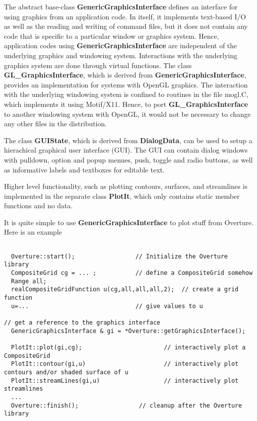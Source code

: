 \documentclass{article}
\newcommand{\Index}[1]{#1\index{#1}}
\begin{document}
The abstract base-class {\bf GenericGraphicsInterface} defines an
interface for using graphics from an application code. In itself, it
implements text-based I/O as well as the reading and writing of
command files, but it does not contain any code that is specific to a
particular window or graphics system. Hence, application codes using
{\bf GenericGraphicsInterface} are independent of the underlying
graphics and windowing system. Interactions with the underlying
graphics system are done through virtual functions. The class {\bf
GL\_GraphicsInterface}, which is derived from {\bf
GenericGraphicsInterface}, provides an implementation for systems with
OpenGL graphics. The interaction with the underlying windowing system
is confined to routines in the file mogl.C, which implements it using
\Index{Motif}/X11. Hence, to port {\bf GL\_GraphicsInterface} to
another windowing system with OpenGL, it would not be necessary to
change any other files in the distribution.

The class {\bf GUIState}, which is derived from {\bf DialogData}, can
be used to setup a hierachical graphical user interface (GUI). The GUI
can contain dialog windows with pulldown, option and popup menues,
push, toggle and radio buttons, as well as informative labels and
textboxes for editable text.

Higher level functionality, such as plotting contours, surfaces, and
streamlines is implemented in the separate class {\bf PlotIt}, which
only contains static member functions and no data.

\vspace{0.1\baselineskip}
It is quite simple to use {\bf GenericGraphicsInterface} to plot stuff from
Overture. Here is an example 
{\footnotesize
\begin{verbatim}

  Overture::start();                 // Initialize the Overture library
  CompositeGrid cg = ... ;           // define a CompositeGrid somehow
  Range all;
  realCompositeGridFunction u(cg,all,all,all,2);  // create a grid function
  u=...                              // give values to u 

// get a reference to the graphics interface
  GenericGraphicsInterface & gi = *Overture::getGraphicsInterface();

  PlotIt::plot(gi,cg);                       // interactively plot a CompositeGrid
  PlotIt::contour(gi,u)                      // interactively plot contours and/or shaded surface of u
  PlotIt::streamLines(gi,u)                  // interactively plot streamlines
  ...
  Overture::finish();                 // cleanup after the Overture library

\end{verbatim}
}
\end{document}
